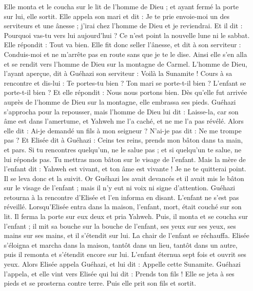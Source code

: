 \begin{multicols}{2}
Elle monta et le coucha sur le lit de l'homme de Dieu ; et ayant fermé la porte sur lui, elle sortit.
Elle appela son mari et dit : Je te prie envoie-moi un des serviteurs et une ânesse ; j'irai chez l'homme de Dieu et je reviendrai.
Et il dit : Pourquoi vas-tu vers lui aujourd'hui ? Ce n'est point la nouvelle lune ni le sabbat. Elle répondit : Tout va bien.
Elle fit donc seller l'ânesse, et dit à son serviteur : Conduis-moi et ne m'arrête pas en route sans que je te le dise.
Ainsi elle s'en alla et se rendit vers l'homme de Dieu sur la montagne de Carmel. L'homme de Dieu, l'ayant aperçue, dit à Guéhazi son serviteur : Voilà la Sunamite !
Cours à sa rencontre et dis-lui : Te portes-tu bien ? Ton mari se porte-t-il bien ? L'enfant se porte-t-il bien ? Et elle répondit : Nous nous portons bien.
Dès qu'elle fut arrivée auprès de l'homme de Dieu sur la montagne, elle embrassa ses pieds. Guéhazi s'approcha pour la repousser, mais l'homme de Dieu lui dit : Laisse-la, car son âme est dans l'amertume, et Yahweh me l'a caché, et ne me l'a pas révélé.
Alors elle dit : Ai-je demandé un fils à mon seigneur ? N'ai-je pas dit : Ne me trompe pas ?
Et Elisée dit à Guéhazi : Ceins tes reins, prends mon bâton dans ta main, et pars. Si tu rencontres quelqu'un, ne le salue pas ; et si quelqu'un te salue, ne lui réponds pas. Tu mettras mon bâton sur le visage de l'enfant.
Mais la mère de l'enfant dit : Yahweh est vivant, et ton âme est vivante ! Je ne te quitterai point. Il se leva donc et la suivit.
Or Guéhazi les avait devancés et il avait mis le bâton sur le visage de l'enfant ; mais il n'y eut ni voix ni signe d'attention. Guéhazi retourna à la rencontre d'Elisée et l'en informa en disant. L'enfant ne s'est pas réveillé.
Lorsqu'Elisée entra dans la maison, l'enfant, mort, était couché sur son lit.
Il ferma la porte sur eux deux et pria Yahweh.
Puis, il monta et se coucha sur l'enfant ; il mit sa bouche sur la bouche de l'enfant, ses yeux sur ses yeux, ses mains sur ses mains, et il s'étendit sur lui. La chair de l'enfant se réchauffa.
Elisée s'éloigna et marcha dans la maison, tantôt dans un lieu, tantôt dans un autre, puis il remonta et s'étendit encore sur lui. L'enfant éternua sept fois et ouvrit ses yeux.
Alors Elisée appela Guéhazi, et lui dit : Appelle cette Sunamite. Guéhazi l'appela, et elle vint vers Elisée qui lui dit : Prends ton fils !
Elle se jeta à ses pieds et se prosterna contre terre. Puis elle prit son fils et sortit.

\end{multicols}
